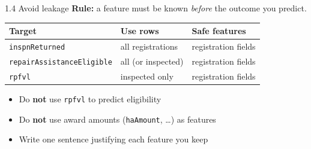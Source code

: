 \documentclass[aspectratio=43,11pt]{beamer}
\begin{document}
\begin{frame}{1.4 Avoid leakage}
  \textbf{Rule:} a feature must be known \emph{before} the outcome you predict.
  \vspace{0.8em}
  \begin{center}
  \small
  \begin{tabular}{@{}lll@{}}
    \toprule
    Target & Use rows & Safe features \\
    \midrule
    \texttt{inspnReturned} & all registrations & registration fields \\
    \texttt{repairAssistanceEligible} & all (or inspected) & registration fields \\
    \texttt{rpfvl} & inspected only & registration fields \\
    \bottomrule
  \end{tabular}
  \end{center}
  \vspace{0.8em}
  \begin{itemize}
    \item Do \textbf{not} use \texttt{rpfvl} to predict eligibility
    \item Do \textbf{not} use award amounts (\texttt{haAmount}, \dots) as features
    \item Write one sentence justifying each feature you keep
  \end{itemize}
\end{frame}
\end{document}
